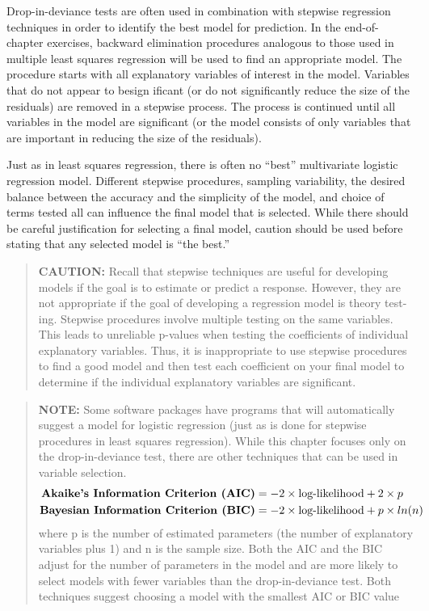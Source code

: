 \documentclass[
]{report}
\begin{document}
Drop-in-deviance tests are often used in combination with stepwise regression techniques in order to
identify the best model for prediction. In the end-of-chapter exercises, backward elimination procedures
analogous to those used in multiple least squares regression will be used to find an appropriate model. The procedure starts with all explanatory variables of interest in the model. Variables that do not appear to besign ificant (or do not significantly reduce the size of the residuals) are removed in a stepwise process. The process is continued until all variables in the model are significant (or the model consists of only variables that are important in reducing the size of the residuals).

Just as in least squares regression, there is often no ``best'' multivariate logistic regression model. Different stepwise procedures, sampling variability, the desired balance between the accuracy and the simplicity of the model, and choice of terms tested all can influence the final model that is selected. While there should be careful justification for selecting a final model, caution should be used before stating that any selected model is ``the best.''

\begin{quote}
\textbf{CAUTION:}
Recall that stepwise techniques are useful for developing models if the goal is to estimate or predict a
response. However, they are not appropriate if the goal of developing a regression model is theory test-
ing. Stepwise procedures involve multiple testing on the same variables. This leads to unreliable p-values when testing the coefficients of individual explanatory variables. Thus, it is inappropriate to use stepwise procedures to find a good model and then test each coefficient on your final model to determine if the individual explanatory variables are significant.
\end{quote}

\begin{quote}
\textbf{NOTE:}
Some software packages have programs that will automatically suggest a model for logistic regression
(just as is done for stepwise procedures in least squares regression). While this chapter focuses only on the drop-in-deviance test, there are other techniques that can be used in variable selection.
\begin{align}
\textbf{Akaike’s Information Criterion (AIC)} &= -2 \times \text{log-likelihood} + 2 \times p \notag \\
\textbf{Bayesian Information Criterion (BIC)} &= -2 \times \text{log-likelihood} + p \times ln(n) \notag
\end{align}
where p is the number of estimated parameters (the number of explanatory variables plus 1) and n is the
sample size. Both the AIC and the BIC adjust for the number of parameters in the model and are more
likely to select models with fewer variables than the drop-in-deviance test. Both techniques suggest choosing a model with the smallest AIC or BIC value
\end{quote}
\end{document}
